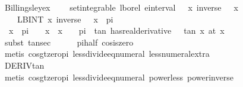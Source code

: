 \documentclass[leqno]{article}
\theoremstyle{definition}
\begin{document}
\begin{figure}
\begin{isabellebody}
\isamarkupfalse%
\ Billingsley{\isacharunderscore}ex{\isacharunderscore}{}{}{\isacharunderscore}{}{\isacharcolon}\ \isanewline
\ \ \ {\isachardoublequoteopen}set{\isacharunderscore}integrable\ lborel\ {\isacharparenleft}einterval\ {\isacharparenleft}{\isacharminus}{\isasyminfinity}{\isacharparenright}\ {\isasyminfinity}{\isacharparenright}\ {\isacharparenleft}{\isasymlambda}x{\isachardot}\ inverse\ {\isacharparenleft}{}\ {\isacharplus}\ x{\isacharcircum}{}{\isacharparenright}{\isacharparenright}{\isachardoublequoteclose}\isanewline
\ \ \ \ {\isachardoublequoteopen}LBINT\ x{\isacharequal}{\isacharminus}{\isasyminfinity}{\isachardot}{\isachardot}{\isasyminfinity}{\isachardot}\ inverse\ {\isacharparenleft}{}\ {\isacharplus}\ x{\isacharcircum}{}{\isacharparenright}\ {\isacharequal}\ pi{\isachardoublequoteclose}\isanewline
{}\isamarkupfalse%
\ {\isacharminus}\isanewline
\ \ \isamarkupfalse%
\ {}{\isacharcolon}\ {\isachardoublequoteopen}{\isasymAnd}x{\isachardot}\ {\isacharminus}\ {\isacharparenleft}pi\ {\isacharslash}\ {}{\isacharparenright}\ {\isacharless}\ x\ {\isasymLongrightarrow}\ x\ {\isacharasterisk}\ {}\ {\isacharless}\ pi\ {\isasymLongrightarrow}\ {\isacharparenleft}tan\ has{\isacharunderscore}real{\isacharunderscore}derivative\ {}\ {\isacharplus}\ {\isacharparenleft}tan\ x{\isacharparenright}\ {\isacharparenleft}at\ x{\isacharparenright}{\isachardoublequoteclose}\isanewline
\ \ \ \ \isamarkupfalse%
\ {\isacharparenleft}subst\ tan{\isacharunderscore}sec{\isacharparenright}\isanewline
\ \ \ \ \isamarkupfalse%
\ pi{\isacharunderscore}half\ cos{\isacharunderscore}is{\isacharunderscore}zero\isanewline
\ \ \ \ \isamarkupfalse%
\ {\isacharparenleft}metis\ cos{\isacharunderscore}gt{\isacharunderscore}zero{\isacharunderscore}pi\ less{\isacharunderscore}divide{\isacharunderscore}eq{\isacharunderscore}numeral{}{\isacharparenleft}{}{\isacharparenright}\ less{\isacharunderscore}numeral{\isacharunderscore}extra{\isacharparenleft}{}{\isacharparenright}{\isacharparenright}\isanewline
\ \ \ \ \isamarkupfalse%
\ DERIV{\isacharunderscore}tan\isanewline
\ \ \ \ \isamarkupfalse%
\ {\isacharparenleft}metis\ cos{\isacharunderscore}gt{\isacharunderscore}zero{\isacharunderscore}pi\ less{\isacharunderscore}divide{\isacharunderscore}eq{\isacharunderscore}numeral{}{\isacharparenleft}{}{\isacharparenright}\ power{}{\isacharunderscore}less{\isacharunderscore}{}\ power{\isacharunderscore}inverse\ \isanewline

\end{isabellebody}
\end{figure}
\end{document}
